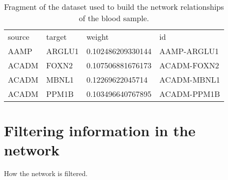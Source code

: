 \begin{table}[h!]
\centering
\begin{tabular}{llll}
\hline
source & target & weight            & id          \\
AAMP   & ARGLU1 & 0.102486209330144 & AAMP-ARGLU1 \\
ACADM  & FOXN2  & 0.107506881676173 & ACADM-FOXN2 \\
ACADM  & MBNL1  & 0.12269622045714  & ACADM-MBNL1 \\
ACADM  & PPM1B  & 0.103496640767895 & ACADM-PPM1B \\
\hline
\end{tabular}
\caption{Fragment of the dataset used to build the network relationships of the blood sample.}
\label{tab:network-data}
\end{table}

\section{Filtering information in the network}
How the network is filtered.
